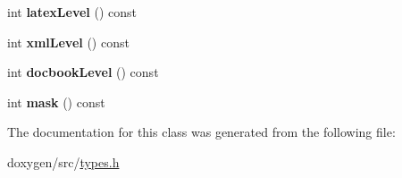 \begin{DoxyCompactItemize}
int {\bfseries latex\+Level} () const
\item 
\mbox{\label{class_local_toc_abca2abf41b05fabc55bbf1deb7eb33cb}} 
int {\bfseries xml\+Level} () const
\item 
\mbox{\label{class_local_toc_a5ecf76de70ae4c4d0c95fa0472282514}} 
int {\bfseries docbook\+Level} () const
\item 
\mbox{\label{class_local_toc_a47011b6d1757ce5a8fdf18211e5cdfe2}} 
int {\bfseries mask} () const
\end{DoxyCompactItemize}


The documentation for this class was generated from the following file\+:\begin{DoxyCompactItemize}
\item 
doxygen/src/\mbox{\hyperlink{types_8h}{types.\+h}}\end{DoxyCompactItemize}
